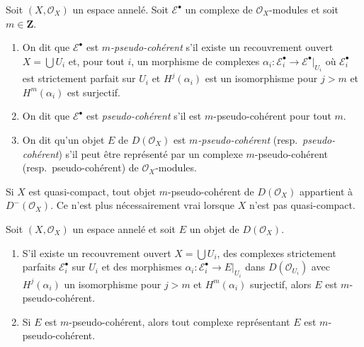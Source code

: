 \begin{definition}

\label{definition-pseudo-coherent}

Soit $(X, \mathcal{O}_X)$ un espace annelé. Soit $\mathcal{E}^\bullet$
un complexe de $\mathcal{O}_X$-modules et soit $m \in \mathbf{Z}$.

\begin{enumerate}

\item On dit que $\mathcal{E}^\bullet$ est {\it $m$-pseudo-cohérent}
s'il existe un recouvrement ouvert $X = \bigcup U_i$ et, pour tout $i$,
un morphisme de complexes
$\alpha_i : \mathcal{E}_i^\bullet \to \mathcal{E}^\bullet|_{U_i}$
où $\mathcal{E}_i^\bullet$ est strictement parfait sur $U_i$ et
$H^j(\alpha_i)$ est un isomorphisme pour $j > m$ et $H^m(\alpha_i)$
est surjectif.
\item On dit que $\mathcal{E}^\bullet$ est {\it pseudo-cohérent}
s'il est $m$-pseudo-cohérent pour tout $m$.
\item On dit qu'un objet $E$ de $D(\mathcal{O}_X)$ est
{\it $m$-pseudo-cohérent} (resp.\ {\it pseudo-cohérent}) s'il peut être représenté par un complexe $m$-pseudo-cohérent (resp.\ pseudo-cohérent) de $\mathcal{O}_X$-modules.

\end{enumerate}

\end{definition}

\noindent
Si $X$ est quasi-compact, tout objet $m$-pseudo-cohérent de $D(\mathcal{O}_X)$ appartient à $D^-(\mathcal{O}_X)$. Ce n'est plus nécessairement vrai lorsque $X$ n'est pas quasi-compact.

\begin{lemma}

\label{lemma-pseudo-coherent-independent-representative}

Soit $(X, \mathcal{O}_X)$ un espace annelé et soit $E$ un objet de $D(\mathcal{O}_X)$.

\begin{enumerate}

\item S'il existe un recouvrement ouvert $X = \bigcup U_i$, des complexes strictement parfaits $\mathcal{E}_i^\bullet$ sur $U_i$ et des morphismes $\alpha_i : \mathcal{E}_i^\bullet \to E|_{U_i}$ dans
$D(\mathcal{O}_{U_i})$ avec $H^j(\alpha_i)$ un isomorphisme pour $j > m$
et $H^m(\alpha_i)$ surjectif, alors $E$ est $m$-pseudo-cohérent.
\item Si $E$ est $m$-pseudo-cohérent, alors tout complexe représentant
$E$ est $m$-pseudo-cohérent.

\end{enumerate}

\end{lemma}

